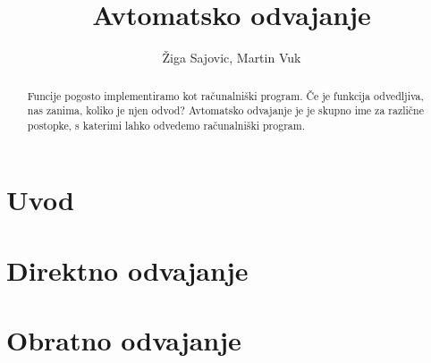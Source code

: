 \documentclass{article}
\title{Avtomatsko odvajanje}
\author{Žiga Sajovic, Martin Vuk}
\begin{document}
\maketitle
\begin{abstract}

  Funcije pogosto implementiramo kot računalniški program. Če je funkcija
  odvedljiva, nas zanima, koliko je njen odvod? Avtomatsko odvajanje je
  je skupno ime za različne postopke, s katerimi lahko odvedemo računalniški program.
\end{abstract}
\section{Uvod}
\section{Direktno odvajanje}
\section{Obratno odvajanje}
\end{document}
